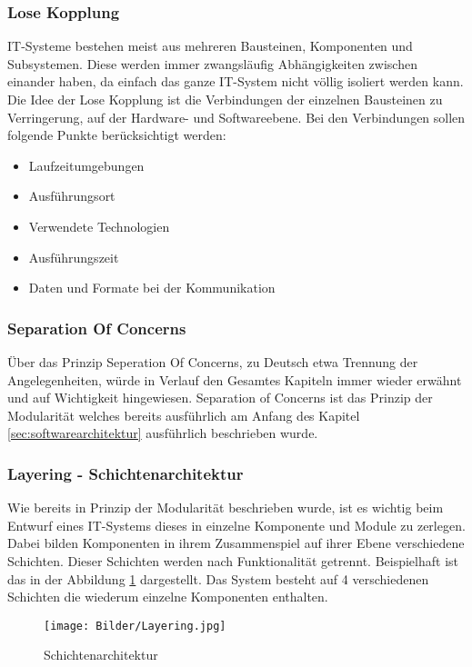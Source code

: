 \subsubsection{Lose Kopplung}
IT-Systeme bestehen meist aus mehreren Bausteinen, Komponenten und Subsystemen. Diese werden immer zwangsläufig Abhängigkeiten zwischen einander haben, da einfach das ganze IT-System nicht völlig isoliert werden kann. Die Idee der Lose Kopplung ist die Verbindungen der einzelnen Bausteinen zu Verringerung, auf der Hardware- und Softwareebene. Bei den Verbindungen sollen folgende Punkte berücksichtigt werden:
\begin{itemize}
\item Laufzeitumgebungen
\item Ausführungsort
\item Verwendete Technologien
\item Ausführungszeit
\item Daten und Formate bei der Kommunikation
\end{itemize}

\subsubsection{Separation Of Concerns}
Über das Prinzip Seperation Of Concerns, zu Deutsch etwa Trennung der Angelegenheiten, würde in Verlauf den Gesamtes Kapiteln immer wieder erwähnt und auf Wichtigkeit hingewiesen. Separation of Concerns ist das Prinzip der Modularität welches bereits ausführlich am Anfang des Kapitel \ref{sec:softwarearchitektur} ausführlich beschrieben wurde.

\subsubsection{Layering - Schichtenarchitektur}
Wie bereits in Prinzip der Modularität beschrieben wurde, ist es wichtig beim Entwurf eines IT-Systems dieses in einzelne Komponente und Module zu zerlegen. Dabei bilden Komponenten in ihrem Zusammenspiel auf ihrer Ebene verschiedene Schichten. Dieser Schichten werden nach Funktionalität getrennt. Beispielhaft ist das in der Abbildung \ref{fig:schichten} dargestellt. Das System besteht auf 4 verschiedenen Schichten die wiederum einzelne Komponenten enthalten.
\begin{figure}[H]
\centering
\texttt{[image: Bilder/Layering.jpg]}
\caption{Schichtenarchitektur\label{fig:schichten}}
\end{figure}

